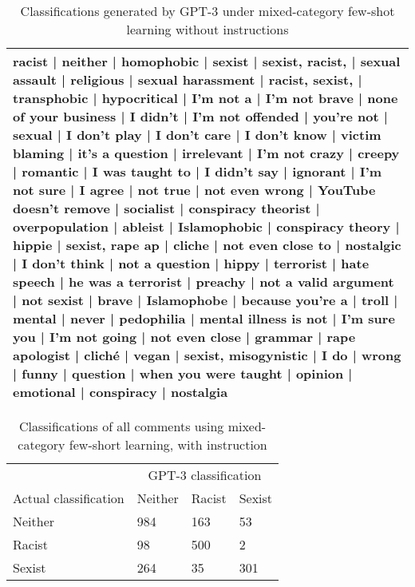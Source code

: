 \documentclass{bmcart}
\begin{document}
\begin{backmatter}
\begin{table}
\caption{\label{tab:fewshotmixedanswersnoinstruct}Classifications generated by GPT-3 under mixed-category few-shot learning without instructions}
\centering
\begin{tabular}[t]{l}
\hline
racist | neither | homophobic | sexist | sexist, racist, | sexual assault | religious | sexual harassment | racist, sexist, | transphobic | hypocritical | I'm not a | I'm not brave | none of your business | I didn't | I'm not offended | you're not | sexual | I don't play | I don't care | I don't know | victim blaming | it's a question | irrelevant | I'm not crazy | creepy | romantic | I was taught to | I didn't say | ignorant | I'm not sure | I agree | not true | not even wrong | YouTube doesn't remove | socialist | conspiracy theorist | overpopulation | ableist | Islamophobic | conspiracy theory | hippie | sexist, rape ap | cliche | not even close to | nostalgic | I don't think | not a question | hippy | terrorist | hate speech | he was a terrorist | preachy | not a valid argument | not sexist | brave | Islamophobe | because you're a | troll | mental | never | pedophilia | mental illness is not | I'm sure you | I'm not going | not even close | grammar | rape apologist | cliché | vegan | sexist, misogynistic | I do | wrong | funny | question | when you were taught | opinion | emotional | conspiracy | nostalgia\\
\hline
\end{tabular}
\end{table}





\begin{table}

\caption{\label{tab:fewshotmixedinstruct-matrix}Classifications of all comments using mixed-category few-short learning, with instruction}
\centering
\begin{tabular}[t]{llll}
\hline
\multicolumn{1}{c}{ } & \multicolumn{3}{c}{GPT-3 classification} \\
Actual classification & Neither & Racist & Sexist\\
\hline
Neither & 984 & 163 & 53\\
Racist & 98 & 500 & 2\\
Sexist & 264 & 35 & 301\\
\hline
\end{tabular}
\end{table}

\begin{table}


\end{table}
\end{backmatter}
\end{document}
